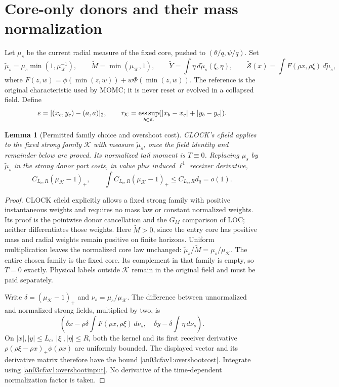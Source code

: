 \documentclass[11pt]{article}
\newtheorem{lemma}[theorem]{Lemma}
\theoremstyle{remark}\newtheorem{remark}[theorem]{Remark}
\newcommand{\dd}{\,d}
\newcommand{\KK}{\mathcal K}
\begin{document}
\section{Core-only donors and their mass normalization}
Let $\mu_s$ be the current radial measure of the fixed core,
pushed to $(\theta/q,\psi/q)$. Set
\begin{equation}
 \widetilde\mu_s=\mu_s\min(1,\mu_{\KK}^{-1}),\qquad
 \widetilde M=\min(\mu_{\KK},1),\qquad
 \widetilde Y=\int\eta\dd\widetilde\mu_s(\xi,\eta),\qquad
 \widetilde{\mathcal S}(x)
       =\int F(\rho x,\rho\xi)\dd\widetilde\mu_s,
 \label{an03cfav1:representation}
\end{equation}
where $F(z,w)=\phi(\min(z,w))+w\Phi(\min(z,w))$.
The reference is the original characteristic used by MOMC;
it is never reset or evolved in a collapsed field. Define
\[
 e=|(x_c,y_c)-(a,a)|_2,\qquad
 r_{\KK}=\mathop{\rm ess\,sup}_{b\in\KK}
 (|x_b-x_c|+|y_b-y_c|).
\]

\begin{lemma}[Permitted family choice and overshoot cost]
\label{an03cfav1:representationlemma}
CLOCK's cfield applies to the fixed strong family $\KK$ with
measure $\widetilde\mu_s$, once the field identity and remainder
below are proved. Its normalized tail moment is $T\equiv0$.
Replacing $\mu_s$ by $\widetilde\mu_s$ in the strong donor part
costs, in value plus induced $\ell^1$ receiver derivative,
\begin{equation}
 C_{L_c,R}(\mu_{\KK}-1)_+,\qquad
 \int C_{L_c,R}(\mu_{\KK}-1)_+\le C_{L_c,R}d_q=o(1).
 \label{an03cfav1:overshootcost}
\end{equation}
\end{lemma}
\begin{proof}
CLOCK cfield explicitly allows a fixed strong family with
positive instantaneous weights and requires no mass law or
constant normalized weights. Its proof is the pointwise donor
cancellation and the $G_M$ comparison of LOC; neither
differentiates those weights. Here $\widetilde M>0$, since
the entry core has positive mass and radial weights remain
positive on finite horizons. Uniform multiplication leaves the
normalized core law unchanged:
$\widetilde\mu_s/\widetilde M=\mu_s/\mu_{\KK}$.
The entire chosen family is the fixed core. Its complement in
that family is empty, so $T=0$ exactly. Physical labels outside
$\KK$ remain in the original field and must be paid separately.

Write $\delta=(\mu_{\KK}-1)_+$ and
$\nu_s=\mu_s/\mu_{\KK}$. The difference between unnormalized
and normalized strong fields, multiplied by two, is
\[
 \left(\delta x-\rho\delta\int F(\rho x,\rho\xi)\dd\nu_s,\quad
       \delta y-\delta\int\eta\dd\nu_s\right).
\]
On $|x|,|y|\le L_c$, $|\xi|,|\eta|\le R$, both the kernel
and its first receiver derivative
$\rho(\rho\xi-\rho x)_+\phi(\rho x)$ are uniformly bounded.
The displayed vector and its derivative matrix therefore
have the bound \eqref{an03cfav1:overshootcost}. Integrate
using \eqref{an03cfav1:overshootinput}. No derivative of the
time-dependent normalization factor is taken.
\end{proof}
\end{document}
